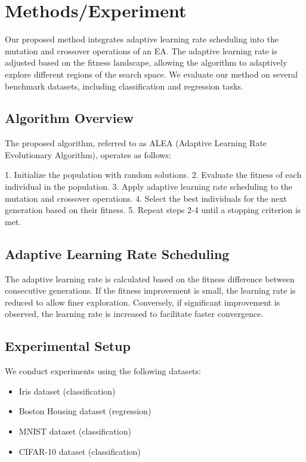 \documentclass{article}
\begin{document}
\section{Methods/Experiment}
Our proposed method integrates adaptive learning rate scheduling into the mutation and crossover operations of an EA. The adaptive learning rate is adjusted based on the fitness landscape, allowing the algorithm to adaptively explore different regions of the search space. We evaluate our method on several benchmark datasets, including classification and regression tasks.

\subsection{Algorithm Overview}
The proposed algorithm, referred to as ALEA (Adaptive Learning Rate Evolutionary Algorithm), operates as follows:

1. Initialize the population with random solutions.
2. Evaluate the fitness of each individual in the population.
3. Apply adaptive learning rate scheduling to the mutation and crossover operations.
4. Select the best individuals for the next generation based on their fitness.
5. Repeat steps 2-4 until a stopping criterion is met.

\subsection{Adaptive Learning Rate Scheduling}
The adaptive learning rate is calculated based on the fitness difference between consecutive generations. If the fitness improvement is small, the learning rate is reduced to allow finer exploration. Conversely, if significant improvement is observed, the learning rate is increased to facilitate faster convergence.

\subsection{Experimental Setup}
We conduct experiments using the following datasets:
\begin{itemize}
    \item Iris dataset (classification)
    \item Boston Housing dataset (regression)
    \item MNIST dataset (classification)
    \item CIFAR-10 dataset (classification)
\end{itemize}
\end{document}
